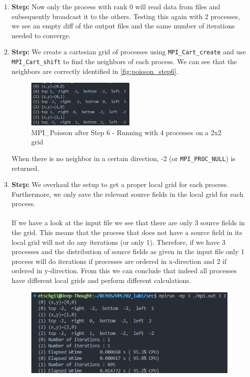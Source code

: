 \begin{enumerate}
    \item \textbf{Step:} Now only the process with rank 0 will read data from files and subsequently broadcast it to the others. Testing this again with 2 processes, we see an empty diff of the output files and the same number of iterations needed to converge.
    \item \textbf{Step:} We create a cartesian grid of processes using \texttt{MPI\_Cart\_create} and use \texttt{MPI\_Cart\_shift} to find the neighbors of each process. We can see that the neighbors are correctly identified in \autoref{fig:poisson_step6}. 
    \begin{figure}[H]
        \centering
        \includegraphics[width=0.5\textwidth]{../fig/lab1/step6.png}
        \caption{MPI\_Poisson after Step 6 - Running with 4 processes on a 2x2 grid}
        \label{fig:poisson_step6}
    \end{figure}
    When there is no neighbor in a certain direction, -2 (or \texttt{MPI\_PROC\_NULL}) is returned. 
    \item \textbf{Step:} We overhaul the setup to get a proper local grid for each process. Furthermore, we only save the relevant source fields in the local grid for each process. \\
    \\
    If we have a look at the input file we see that there are only 3 source fields in the grid. This means that the process that does not have a source field in its local grid will not do any iterations (or only 1). Therefore, if we have 3 processes and the distribution of source fields as given in the input file only 1 process will do iterations if processes are ordered in x-direction and 2 if ordered in y-direction. From this we can conclude that indeed all processes have different local grids and perform different calculations. 
    \begin{figure}[H]
        \centering
        \begin{minipage}{0.48\textwidth}
            \centering
            \includegraphics[width=\linewidth]{../fig/lab1/step7a.png}

\end{minipage}
\end{figure}
\end{enumerate}
